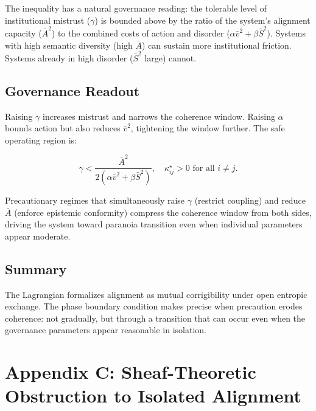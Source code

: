 \documentclass[11pt,a4paper]{article}
\theoremstyle{definition}
\theoremstyle{plain}
\begin{document}
\begin{mdframed}[style=appendixbox]
The inequality has a natural governance reading: the tolerable level of institutional mistrust ($\gamma$) is bounded above by the ratio of the system's alignment capacity ($\bar{A}^2$) to the combined costs of action and disorder ($\alpha \bar{v}^2 + \beta \bar{S}^2$). Systems with high semantic diversity (high $\bar{A}$) can sustain more institutional friction. Systems already in high disorder ($\bar{S}^2$ large) cannot.

\subsection{Governance Readout}
Raising $\gamma$ increases mistrust and narrows the coherence window. Raising $\alpha$ bounds action but also reduces $\bar{v}^2$, tightening the window further. The safe operating region is:

\begin{equation}
\gamma < \frac{\bar{A}^2}{2(\alpha \bar{v}^2 + \beta \bar{S}^2)}, \quad \kappa_{ij}^{\star} > 0 \text{ for all } i \neq j.
\end{equation}

Precautionary regimes that simultaneously raise $\gamma$ (restrict coupling) and reduce $\bar{A}$ (enforce epistemic conformity) compress the coherence window from both sides, driving the system toward paranoia transition even when individual parameters appear moderate.

\subsection{Summary}
The Lagrangian formalizes alignment as mutual corrigibility under open entropic exchange. The phase boundary condition makes precise when precaution erodes coherence: not gradually, but through a transition that can occur even when the governance parameters appear reasonable in isolation.

\end{mdframed}

\section*{Appendix C: Sheaf-Theoretic Obstruction to Isolated Alignment}
\end{document}
